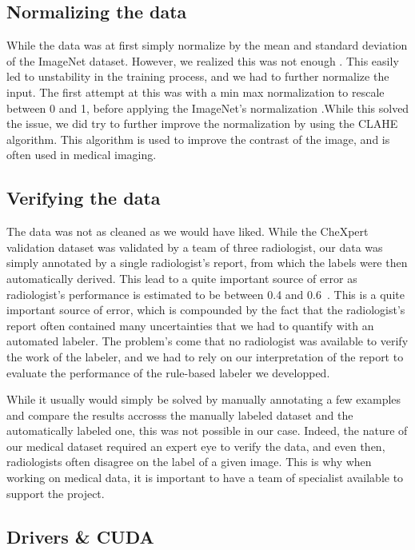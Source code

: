 \documentclass[11pt]{article}
\begin{document}
    \subsection{Normalizing the data}

        While the data was at first simply normalize by the mean and standard deviation of the ImageNet dataset.
        However, we realized this was not enough . This easily led to unstability in the training process, and we had to further
        normalize the input. The first attempt at this was with a min max normalization to rescale between 0 and 1, before applying the ImageNet's normalization
        .While this solved the issue, we did try to further improve the normalization by using the CLAHE algorithm. This algorithm is used to improve the contrast of the image, and is often used in medical imaging.

    \subsection{Verifying the data}
            The data was not as cleaned as we would have liked. While the CheXpert validation dataset was validated by a team of three radiologist, our data
            was simply annotated by a single radiologist's report, from which the labels were then automatically derived. This lead to a quite important source of error as radiologist's performance
            is estimated to be between 0.4 and 0.6~\cite{radiologist_performance}. This is a quite important source of error, which is compounded
            by the fact that the radiologist's report often contained many uncertainties that we had
            to quantify with an automated labeler. The problem's come that no radiologist was available to verify the work of the labeler, and we had to rely on our interpretation of
            the report to evaluate the performance of the rule-based labeler we developped.

            While it usually would simply be solved by manually annotating a few examples and compare the results accrosss the manually labeled dataset
            and the automatically labeled one, this was not possible in our case. Indeed, the nature of our medical dataset required an expert eye to verify the data,
            and even then, radiologists often disagree on the label of a given image. This is why when working on medical data, it is important to have a team of specialist available to support the project.


    \subsection{Drivers \& CUDA}
\end{document}
